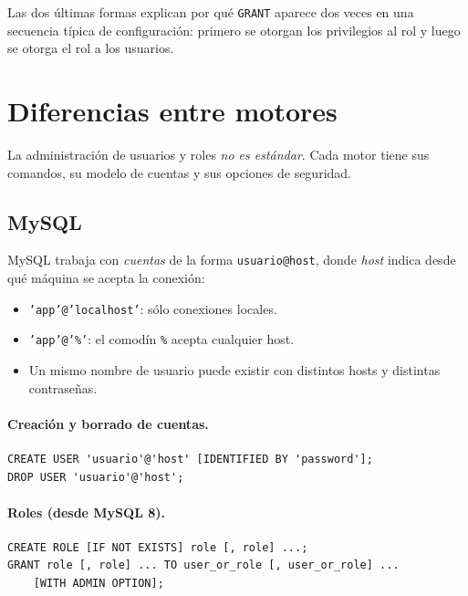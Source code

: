 \documentclass[11pt,a4paper]{article}
\begin{document}
Las dos últimas formas explican por qué \texttt{GRANT} aparece dos veces
en una secuencia típica de configuración: primero se otorgan los
privilegios al rol y luego se otorga el rol a los usuarios.

\section{Diferencias entre motores}

La administración de usuarios y roles \emph{no es estándar}. Cada motor
tiene sus comandos, su modelo de cuentas y sus opciones de seguridad.

\subsection{MySQL}

MySQL trabaja con \emph{cuentas} de la forma \texttt{usuario@host}, donde
\emph{host} indica desde qué máquina se acepta la conexión:

\begin{itemize}
    \item \texttt{'app'@'localhost'}: sólo conexiones locales.
    \item \texttt{'app'@'\%'}: el comodín \texttt{\%} acepta cualquier
    host.
    \item Un mismo nombre de usuario puede existir con distintos hosts y
    distintas contraseñas.
\end{itemize}

\paragraph{Creación y borrado de cuentas.}

\begin{lstlisting}
CREATE USER 'usuario'@'host' [IDENTIFIED BY 'password'];
DROP USER 'usuario'@'host';
\end{lstlisting}

\paragraph{Roles (desde MySQL 8).}

\begin{lstlisting}
CREATE ROLE [IF NOT EXISTS] role [, role] ...;
GRANT role [, role] ... TO user_or_role [, user_or_role] ...
    [WITH ADMIN OPTION];
\end{lstlisting}
\end{document}
